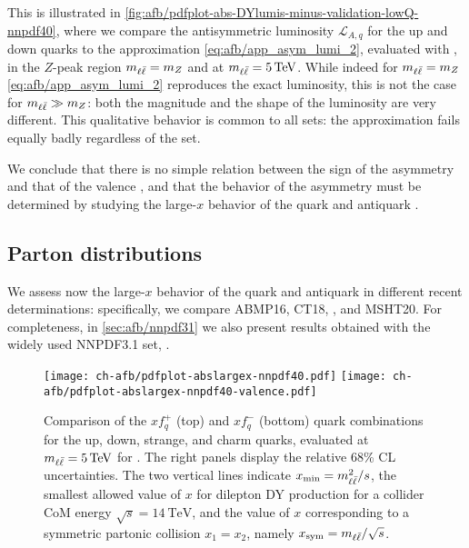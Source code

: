 This is illustrated in
\cref{fig:afb/pdfplot-abs-DYlumis-minus-validation-lowQ-nnpdf40}, where we
compare the antisymmetric luminosity $\mathcal{L}_{A,q}$ for the up and down
quarks  to the approximation \cref{eq:afb/app_asym_lumi_2}, evaluated with
 \nnlo, in the $Z$-peak region $m_{\ell\bar{\ell}}=m_Z$  and at
$\mll=\SI{5}{\tera\electronvolt}$.
%
While indeed for $m_{\ell\bar{\ell}}=m_Z$ \cref{eq:afb/app_asym_lumi_2} reproduces the exact
luminosity, this is not the case for $m_{\ell\bar{\ell}}\gg m_Z$: both the magnitude and the
shape of the luminosity are  very different.
%
This qualitative behavior is common to all \pdf sets: the approximation fails
equally badly regardless of the \pdf set.

We conclude that there is no simple relation between the sign of the asymmetry
and that of the valence \pdf, and that the behavior of the asymmetry must be
determined by studying the large-$x$ behavior of the quark and antiquark \pdfs.

\subsection{Parton distributions}
\label{sec:afb/subsec-largexPDFs}

We assess now the large-$x$ behavior of the quark and antiquark \pdfs in
different recent \pdf determinations: specifically, we compare ABMP16, CT18, 
, and MSHT20.
%
For completeness, in \cref{sec:afb/nnpdf31} we also present results obtained
with the widely used NNPDF3.1 set, \cite{Ball:2017nwa}.

\begin{figure}[!t]
  \centering
  \texttt{[image: ch-afb/pdfplot-abslargex-nnpdf40.pdf]}
  \texttt{[image: ch-afb/pdfplot-abslargex-nnpdf40-valence.pdf]}
  \caption{\small
    Comparison of the $xf^+_q$ (top) and $xf_q^-$ (bottom) quark \pdf
    combinations for the up, down, strange, and charm quarks, evaluated at
    $\mll=\SI{5}{\tera\electronvolt}$ for  \nnlo.
    The right panels display the relative 68\% CL uncertainties.
    The two vertical lines indicate $x_{\text{min}}=m_{\ell\bar{\ell}}^2/s$, the smallest
    allowed value of $x$  for dilepton DY production for a collider CoM energy
    $\sqrt{s}=\SI{14}{\tera\electronvolt}$, and the value of $x$ corresponding
    to a symmetric partonic collision $x_1=x_2$, namely
    $x_{\text{sym}}=m_{\ell\bar{\ell}}/\sqrt{s}$.
  }    
  \label{fig:afb/pdfplot-abslargex}
\end{figure}

